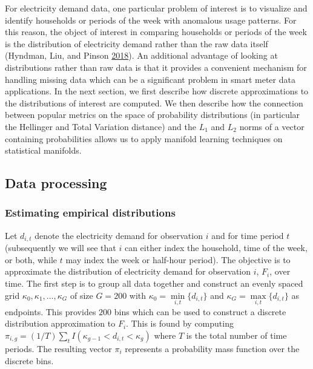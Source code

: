 \documentclass[12pt]{article}
\begin{document}
For electricity demand data, one particular problem of interest is to visualize and identify households or periods of the week with anomalous usage patterns. For this reason, the object of interest in comparing households or periods of the week is the distribution of electricity demand rather than the raw data itself (Hyndman, Liu, and Pinson \protect\hyperlink{ref-Hyndman2018-nq}{2018}). An additional advantage of looking at distributions rather than raw data is that it provides a convenient mechanism for handling missing data which can be a significant problem in smart meter data applications. In the next section, we first describe how discrete approximations to the distributions of interest are computed. We then describe how the connection between popular metrics on the space of probability distributions (in particular the Hellinger and Total Variation distance) and the \(L_1\) and \(L_2\) norms of a vector containing probabilities allows us to apply manifold learning techniques on statistical manifolds.

\hypertarget{dataprocessing}{%
\subsection{Data processing}\label{dataprocessing}}

\hypertarget{estimating-empirical-distributions}{%
\subsubsection*{Estimating empirical distributions}\label{estimating-empirical-distributions}}

Let \(d_{i,t}\) denote the electricity demand for observation \(i\) and for time period \(t\) (subsequently we will see that \(i\) can either index the household, time of the week, or both, while \(t\) may index the week or half-hour period). The objective is to approximate the distribution of electricity demand for observation \(i\), \(F_i\), over time. The first step is to group all data together and construct an evenly spaced grid \(\kappa_0,\kappa_1,\dots,\kappa_G\) of size \(G=200\) with \(\kappa_0=\underset{i,t}{\min} \{d_{i,t}\}\) and \(\kappa_G=\underset{i,t}{\max} \{d_{i,t}\}\) as endpoints. This provides \(200\) bins which can be used to construct a discrete distribution approximation to \(F_i\). This is found by computing \(\pi_{i,g}=(1/T)\sum_t I(\kappa_{g-1}<d_{i,t}<\kappa_g)\) where \(T\) is the total number of time periods. The resulting vector \(\pi_i\) represents a probability mass function over the discrete bins.
\end{document}
